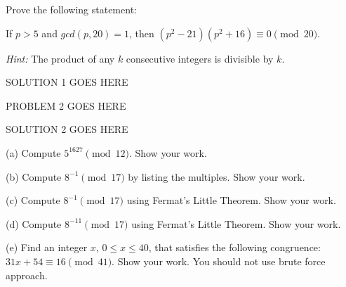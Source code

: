 \documentclass[11pt]{article}
\begin{document}
	

\medskip


\lineacross


\begin{problem} %
	\vspace{0.05in}
    \noindent  Prove the following statement: 
    
    
    \noindent 
    If $p > 5$ and $gcd(p, 20) = 1$,
    then $(p^2 -21)(p^2 +16)\equiv 0 \pmod{20}$.
    
    \vspace{0.1in}
    \noindent  
    \emph{Hint:} 
    The product of any $k$ consecutive integers is divisible by $k$.

\end{problem}


\begin{solution} %
	SOLUTION 1 GOES HERE
\end{solution}


\begin{problem}
	PROBLEM 2 GOES HERE
\end{problem}


\begin{solution}
	SOLUTION 2 GOES HERE
\end{solution}

\pagebreak
\begin{problem} %
 	

    \medskip\noindent
    (a) Compute $5^{1627}\pmod{12}$. Show your work.
    
    \medskip\noindent
    (b) Compute $8^{-1}\pmod{17}$ by listing the multiples. Show your work.
    
    \medskip\noindent
    (c) Compute $8^{-1}\pmod{17}$ using Fermat's Little Theorem. Show your work.
    
    \medskip\noindent
    (d) Compute $8^{-11}\pmod{17}$ using Fermat's Little Theorem. Show your work.
    
    \medskip\noindent
    (e) Find an integer $x$, $0\le x \le 40$, that satisfies the following congruence:
    $31x + 54 \equiv 16 \pmod{41}$. Show your work. You should not use brute force approach.
    

\end{problem}
\end{document}
